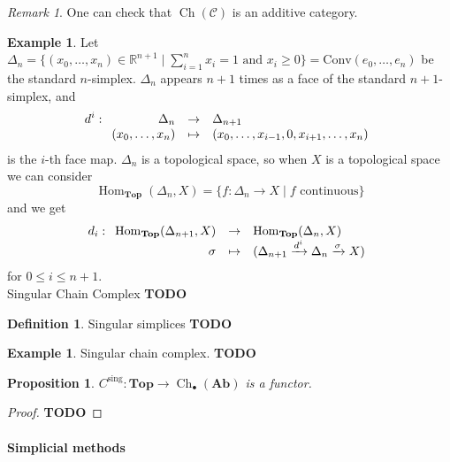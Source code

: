 \documentclass{article}
\newcommand{\sing}{\mathrm{sing}}
\newcommand{\R}{\mathbb{R}}
\newcommand{\cat}{\mathcal{C}}
\newcommand{\Top}{\mathbf{Top}}
\newcommand{\Ab}{\mathbf{Ab}}
\DeclareMathOperator{\Ch}{Ch}
\DeclareMathOperator{\Hom}{Hom}
\newcommand{\todo}{\textbf{TODO}}
\newcommand{\applic}[4]{\begin{array}[t]{rcl}
#1 & \to & #2 \\
#3 & \mapsto & #4
\end{array}}
\theoremstyle{plain}
\newtheorem{proposition}[theorem]{Proposition}
\theoremstyle{definition}
\newtheorem{definition}[theorem]{Definition}
\newtheorem{example}[theorem]{Example}
\theoremstyle{remark}
\newtheorem*{remark}{Remark}
\begin{document}
\begin{remark}
    One can check that $\Ch(\cat)$ is an additive category.
\end{remark}

\begin{example}
    Let $\Delta_n = \{(x_0,\dots,x_n) \in \R^{n+1} \mid \sum\limits_{i=1}^n x_i = 1 \text{ and } x_i \ge 0\} = \mathrm{Conv}(e_0,\dots,e_n)$ be the standard $n$-simplex. $\Delta_n$ appears $n+1$ times as a face of the standard $n+1$-simplex, and
    \[d^i : \applic{\Delta_n}{\Delta_{n+1}}{(x_0,\dots,x_n)}{(x_0,\dots,x_{i-1},0,x_{i+1},\dots,x_n)}\]
    is the $i$-th face map. $\Delta_n$ is a topological space, so when $X$ is a topological space we can consider
    \[\Hom_\Top (\Delta_n,X) = \{f : \Delta_n \to X \mid f \text{ continuous}\}\]
    and we get
    \[d_i : \applic{\Hom_\Top(\Delta_{n+1},X)}{\Hom_\Top(\Delta_n,X)}{\sigma}{(\Delta_{n+1} \xrightarrow{d^i} \Delta_{n} \xrightarrow{\sigma} X)}\]
    for $0 \le i \le n+1$. \\
    Singular Chain Complex \todo
\end{example}

\begin{definition}
    Singular simplices \todo
\end{definition}

\begin{example}
    Singular chain complex. \todo
\end{example}

\begin{proposition}
    $C^\sing : \Top \to \Ch_\bullet (\Ab)$ is a functor.
\end{proposition}

\begin{proof}
    \todo
\end{proof}

\paragraph{Simplicial methods}
\end{document}
